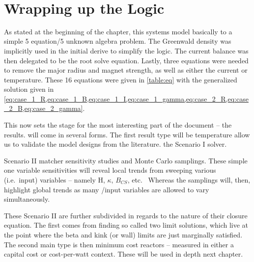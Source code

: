 ~ \\ 

\section{Wrapping up the Logic}

As stated at the beginning of the chapter, this systems model basically  to a simple 5 equation/5 unknown algebra problem. The Greenwald density was implicitly used in the initial derive to simplify the logic. The current balance was then delegated to be the root solve equation. Lastly, three equations were needed to remove the major radius and magnet strength, as well as either the current or temperature. These 16 equations were given in \cref{table:eq} with the generalized solution given in \cref{eq:case_1_R,eq:case_1_B,eq:case_1_I,eq:case_1_gamma,eq:case_2_R,eq:case_2_B,eq:case_2_gamma}.

This now sets the stage for the most interesting part of the document -- the results.  will come in several forms. The first result type will be temperature  allow us to validate the model  designs from the literature.  the Scenario I solver.

 Scenario II matcher  sensitivity studies and Monte Carlo samplings. These simple one variable sensitivities will reveal local trends from sweeping various  (i.e.\ input) variables -- namely H, $\kappa$, $B_{CS}$, etc.\  Whereas the samplings will, then, highlight global trends as many /input variables are allowed to vary simultaneously.

 These Scenario II  are further subdivided in regards to the nature of their closure equation. The first  comes from finding so called two limit solutions, which live at the point where the beta and kink (or wall) limits are just marginally satisfied. The second main type is then minimum cost reactors -- measured in either a capital cost or cost-per-watt context. These will be used in depth next chapter.

%
